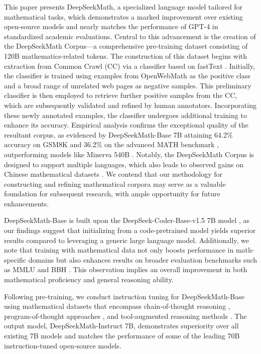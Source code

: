 This paper presents DeepSeekMath, a specialized language model tailored for mathematical tasks, which demonstrates a marked improvement over existing open-source models and nearly matches the performance of GPT-4 in standardized academic evaluations. Central to this advancement is the creation of the DeepSeekMath Corpus—a comprehensive pre-training dataset consisting of 120B mathematics-related tokens. The construction of this dataset begins with extraction from Common Crawl (CC) via a classifier based on fastText \citep{joulin2016fasttext}. Initially, the classifier is trained using examples from OpenWebMath \citep{openwebmath} as the positive class and a broad range of unrelated web pages as negative samples. This preliminary classifier is then employed to retrieve further positive samples from the CC, which are subsequently validated and refined by human annotators. Incorporating these newly annotated examples, the classifier undergoes additional training to enhance its accuracy. Empirical analysis confirms the exceptional quality of the resultant corpus, as evidenced by DeepSeekMath-Base 7B attaining 64.2\% accuracy on GSM8K \citep{gsm8k} and 36.2\% on the advanced MATH benchmark \citep{MATH}, outperforming models like Minerva 540B \citep{minerva}. Notably, the DeepSeekMath Corpus is designed to support multiple languages, which also leads to observed gains on Chinese mathematical datasets \citep{wei2023cmath,agieval}. We contend that our methodology for constructing and refining mathematical corpora may serve as a valuable foundation for subsequent research, with ample opportunity for future enhancements.

DeepSeekMath-Base is built upon the DeepSeek-Coder-Base-v1.5 7B model \citep{deepseek-coder}, as our findings suggest that initializing from a code-pretrained model yields superior results compared to leveraging a generic large language model. Additionally, we note that training with mathematical data not only boosts performance in math-specific domains but also enhances results on broader evaluation benchmarks such as MMLU \citep{mmlu} and BBH \citep{bbh}. This observation implies an overall improvement in both mathematical proficiency and general reasoning ability.

Following pre-training, we conduct instruction tuning for DeepSeekMath-Base using mathematical datasets that encompass chain-of-thought reasoning \citep{cot}, program-of-thought approaches \citep{pot,pal}, and tool-augmented reasoning methods \citep{tora}. The output model, DeepSeekMath-Instruct 7B, demonstrates superiority over all existing 7B models and matches the performance of some of the leading 70B instruction-tuned open-source models.

